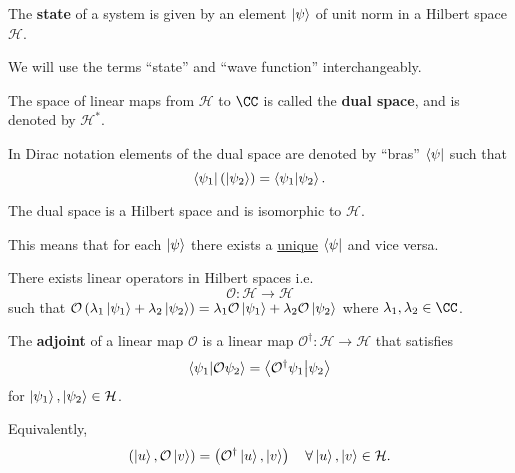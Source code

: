 \documentclass[12pt, a4paper]{article}
\newcommand{\hilbert}{\mathcal H}
\begin{document}
\begin{definition}
    The \textbf{state} of a system is given by an element \(\ket{\psi}\) of unit norm in a Hilbert space \(\hilbert\).
\end{definition}

\begin{mdcor}
    We will use the terms ``state'' and ``wave function'' interchangeably.
\end{mdcor}

\begin{definition}
    The space of linear maps from \(\hilbert\) to \(\CC\) is called the \textbf{dual space}, and is denoted by \(\hilbert^*\).
\end{definition}

In Dirac notation elements of the dual space are denoted by ``bras'' \(\bra{\psi}\) such that 
\[\bra{\psi_1} \left( \ket{\psi_2} \right) = \bra{\psi_1} \ket{\psi_2}.\]

\begin{mdthm}
    The dual space is a Hilbert space and is isomorphic to \(\hilbert\).
\end{mdthm}

\begin{mdnote}
    This means that for each \(\ket{\psi}\) there exists a \underline{unique} \(\bra{\psi}\) and vice versa.
\end{mdnote}

\begin{theorem}
    There exists linear operators in Hilbert spaces i.e. 
    \[\mathcal{O} : \hilbert \to \hilbert\]
    such that \(\mathcal{O}\left( \lambda_1 \ket{\psi_1} +\lambda_2\ket{\psi_2} \right) =\lambda_1 \mathcal{O} \ket{\psi_1}+\lambda_2 \mathcal{O} \ket{\psi_2}\) where \(\lambda_1,\lambda_2 \in \CC\).
\end{theorem}

\begin{definition}
    The \textbf{adjoint} of a linear map \(\mathcal{O}\) is a linear map \(\mathcal{O}^\dagger : \hilbert \to \hilbert\) that satisfies 
    \[\bra{\psi_1} \ket{\mathcal{O} \psi_2} = \bra{\mathcal{O}^{\dagger}\psi_1} \ket{\psi_2}\]
    for \(\ket{\psi_1},\ket{\psi_2} \in \hilbert\).
\end{definition}

\begin{mdnote}
    Equivalently,
    \[\left( \ket{u}, \mathcal{O}\ket{v} \right) = \left( \mathcal{O}^{\dagger} \ket{u}, \ket{v} \right) \quad \forall \ket{u},\ket{v} \in \mathcal{H}.\]
\end{mdnote}
\end{document}
